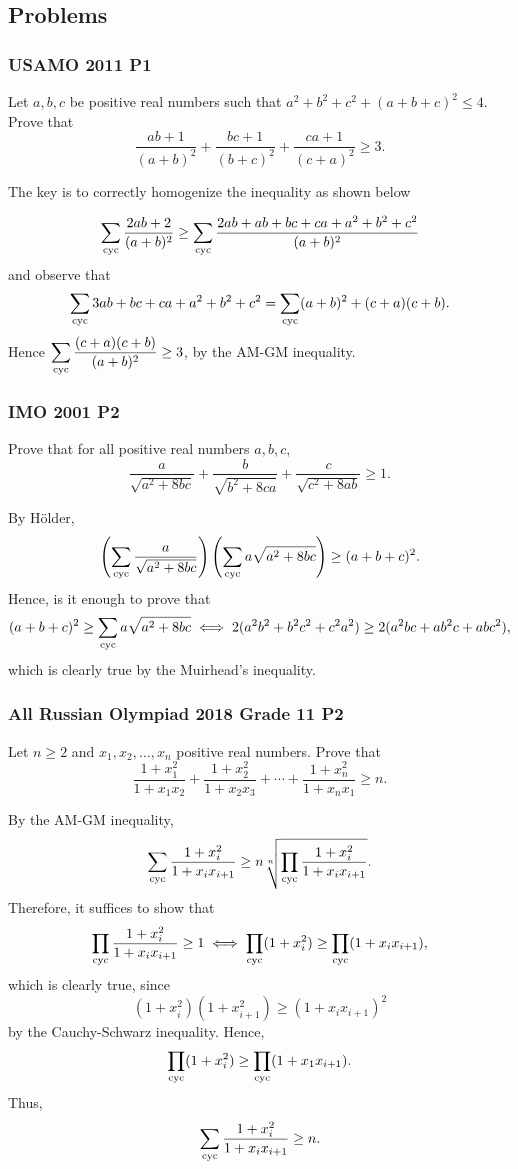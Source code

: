 \subsection{\textsf{Problems}}
\subsubsection{USAMO 2011 P1}
\begin{problem}
Let $a, b, c$ be positive real numbers such that $a^2+b^2+c^2+(a+b+c)^2\leq4$. Prove that
\[\frac{ab+1}{(a+b)^2}+\frac{bc+1}{(b+c)^2}+\frac{ca+1}{(c+a)^2}\geq 3.\]
\end{problem}

The key is to correctly homogenize the inequality as shown below

\[
	\sum_{\text{cyc}} \frac{2ab+2}{(a+b)^2} \geq \sum_{\text{cyc}} \frac{2ab+ab+bc+ca+a^2+b^2+c^2}{(a+b)^2}
\]
and observe that
\[
	\displaystyle \sum_{\text{cyc}} 3ab+bc+ca+a^2+b^2+c^2= \sum_{\text{cyc}} (a+b)^2 + (c+a)(c+b).
\]
Hence $\displaystyle \sum_{\text{cyc}} \frac{(c+a)(c+b)}{(a+b)^2} \geq 3$, by the AM-GM inequality.

\clearpage

\subsubsection{IMO 2001 P2}
\begin{problem}
Prove that for all positive real numbers $a,b,c$,\[ \frac{a}{\sqrt{a^2 + 8bc}} + \frac{b}
	{\sqrt{b^2 + 8ca}} + \frac{c}{\sqrt{c^2 + 8ab}} \geq 1.  \]
\end{problem}

By Hölder,
\[
	\left(\sum_{\text{cyc}} \frac{a}{\sqrt{a^2+8bc}}\right)\left(\sum_{\text{cyc}} a \sqrt{a^2+8bc}\right) \geq (a+b+c)^2.
\]
Hence, is it enough to prove that
\[
	\displaystyle (a+b+c)^2 \geq \sum_{\text{cyc}} a \sqrt{a^2+8bc} \iff 2(a^2b^2 +b^2c^2 + c^2a^2) \geq 2(a^2bc + ab^2c + abc^2),
\]
which is clearly true by the Muirhead's inequality.
\clearpage
\subsubsection{All Russian Olympiad 2018 Grade 11 P2}
\begin{problem}
Let $n\geq 2$ and $x_{1},x_{2},\ldots,x_{n}$ positive real numbers. Prove that
\[
	\frac{1+x_{1}^2}{1+x_{1}x_{2}}+\frac{1+x_{2}^2}{1+x_{2}x_{3}}+\cdots+\frac{1+x_{n}^2}{1+x_{n}x_{1}}\geq n.
\]
\end{problem}

By the AM-GM inequality,
\[
	\sum_{\text{cyc}} \frac{1+x^2_i}{1+x_ix_{i+1}} \ge
	n\sqrt[n]{\prod_{\text{cyc}} \frac{1+x^2_i}{1+x_ix_{i+1}}}.
\]
Therefore, it suffices to show that
\[
	\prod_{\text{cyc}} \frac{1+x^2_i}{1+x_ix_{i+1}} \ge
	1 \iff \prod_{\text{cyc}} (1+x^2_i) \ge \prod_{\text{cyc}} (1+x_ix_{i+1}),
\]
which is clearly true, since
\[
	(1+x^2_i)(1+x^2_{i+1}) \ge (1+x_ix_{i+1})^2
\]
by the Cauchy-Schwarz inequality. Hence,
\[
	\prod_{\text{cyc}} (1+x^2_i) \ge \prod_{\text{cyc}} (1+x_1x_{i+1}).
\]
Thus,
\[
	\sum_{\text{cyc}} \frac{1+x^2_i}{1+x_ix_{i+1}} \ge n.
\]

